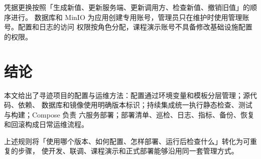 凭据更换按照「生成新值、更新服务端、更新调用方、检查新值、撤销旧值」的顺序进行。
数据库和 MinIO 为应用创建专用账号，管理员只在维护时使用管理账号。配置和日志的访问
权限按角色分配，课程演示账号不具备修改基础设施配置的权限。

\section{结论}

本文给出了寻迹项目的配置与运维方法：配置通过环境变量和模板分层管理；源代码、依赖、
数据库和镜像使用明确版本标识；持续集成统一执行静态检查、测试与构建；Compose 负责
六服务部署；部署清单、巡检、日志、指标、备份、恢复和回滚构成日常运维流程。

上述规则将「使用哪个版本、如何配置、怎样部署、运行后检查什么」转化为可重复的步骤，
使开发、联调、课程演示和正式部署能够沿用同一套管理方式。
